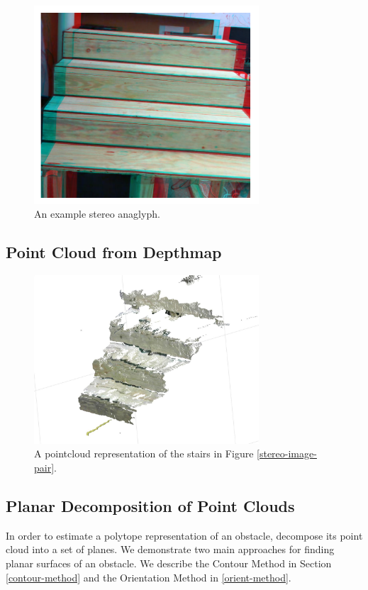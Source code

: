 \begin{figure}[!h]
\centering
\includegraphics[width=3.3in]{Sections/Figures/stereo_anaglyph.png}
\caption{An example stereo anaglyph.}
\label{stereo-anaglyph}
\end{figure}

\subsection{Point Cloud from Depthmap} \label{pointcloud-section}

\begin{figure}[!h]
\centering
\includegraphics[width=3.3in]{Sections/Figures/example_stairs_pointcloud.jpg}
\caption{A pointcloud representation of the stairs in Figure \ref{stereo-image-pair}.}
\label{pointcloud-example}
\end{figure}

\subsection{Planar Decomposition of Point Clouds} \label{plane-section}

In order to estimate a polytope representation of an obstacle, decompose its point cloud into a set of planes. We demonstrate two main approaches for finding planar surfaces of an obstacle. We describe the Contour Method in Section \ref{contour-method} and the Orientation Method in \ref{orient-method}.

